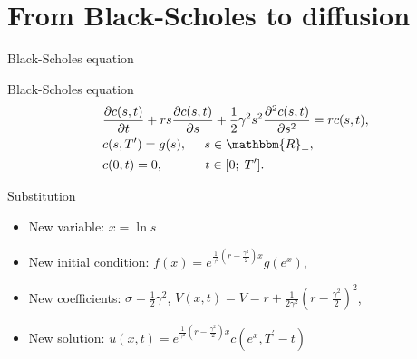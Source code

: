 \documentclass{beamer}
\theoremstyle{definition}
\theoremstyle{plain}
\theoremstyle{remark}
\begin{document}
	\section{From Black-Scholes to diffusion }

		\begin{frame}{Black-Scholes equation}
			\vspace{-5pt}
			\begin{block}{Black-Scholes equation}
				\begin{equation}
					\begin{aligned}
						&\frac{\partial c(s,t)}{\partial t} +
						rs \frac{\partial c(s,t)}{\partial s} +
						\frac12 \gamma^2 s^2 \frac{\partial^2 c(s,t)}{\partial s^2} =
						rc(s,t),\\
						&c(s,T^{\prime}) = g(s), \;\;\;\;\; s \in \mathbbm{R}_{+},\\
						&c(0,t) = 0, \;\;\;\;\;\;\;\;\;\;\;\; t \in [0;\;T^{\prime}].
						\nonumber
					\end{aligned}
				\end{equation}
			\end{block}

			\vspace{-5pt}
			\begin{block}{Substitution}
						\begin{itemize}
							\item New variable: $x=\ln s$
							\item New initial condition: $f(x) = e^{\frac{1}{\gamma^2} (r-\frac{\gamma^2}{2})x} g(e^x)$,
							\item New coefficients: $\sigma = \frac12 \gamma^2$,
						 			$V(x,t) = V = r +  \frac{1}{2\gamma^2} \left( r-\frac{\gamma^2}{2}\right)^2$,
						 	\item New solution: $u(x,t) =  e^{\frac{1}{\gamma^2} (r-\frac{\gamma^2}{2})x} c(e^x, T^{\prime} - t)$
						\end{itemize}
			\end{block}
							
		\end{frame}
\end{document}
